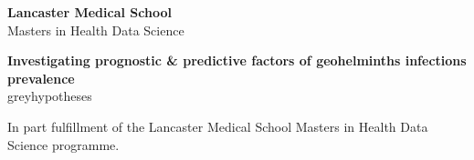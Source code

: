 
\begin{titlepage}

        \begin{center}

            \vspace*{1cm}

            \textbf{Lancaster Medical School}\\
            Masters in Health Data Science

            \vspace{3.5cm}

            \textbf{Investigating prognostic \& predictive factors of geohelminths infections prevalence}\\
            greyhypotheses

            \vfill

            In part fulfillment of the Lancaster Medical School Masters in Health Data Science programme.

        \end{center}

\end{titlepage}